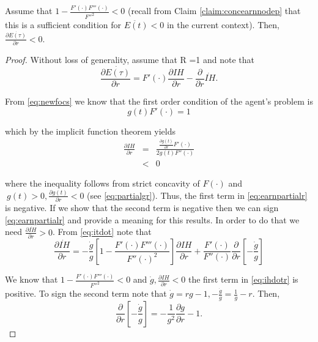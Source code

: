 \begin{claim} \label{claim:moreconcwithighr}
Assume that $1 - \frac{F'(\cdot) F'''(\cdot)}{{F''}^2} < 0$ (recall from Claim \ref{claim:concearnnodep} that this is a sufficient condition for $\ddot{E(t)}<0$ in the current context). Then, $\frac{\partial \dot{E(\tau)}}{\partial r} < 0$.
\end{claim} 

\begin{proof}
Without loss of generality, assume that R =1 and note that\\
\begin{equation}
\frac{\partial \dot{E(\tau)} }{\partial r} = F'(\cdot) \frac{\partial IH}{\partial r} - \frac{\partial}{\partial r} \dot{IH}. \label{eq:earnpartialr}
\end{equation}

\noindent From \eqref{eq:newfocs} we know that the first order condition of the agent's problem is
\begin{equation}
g(t) F'(\cdot) = 1
\end{equation}

\noindent which by the implicit function theorem yields
\begin{eqnarray}
\frac{\partial IH}{\partial r} &=& \frac{\frac{\partial g(t)}{\partial r} F'(\cdot)}{2 g(t) F''(\cdot)} \nonumber \\ 
&<& 0
\end{eqnarray}

\noindent where the inequality follows from strict concavity of $F(\cdot)$ and  $\ g(t) > 0, \frac{\partial g(t)}{ \partial r} <0$ (see \eqref{eq:partialgr}). Thus, the first term in \eqref{eq:earnpartialr} is negative. If we show that the second term is negative then we can sign \eqref{eq:earnpartialr} and provide a meaning for this results. In order to do that we need $\frac{\partial \dot{IH}}{\partial r} > 0$. From \eqref{eq:itdot} note that 
\begin{equation}
\frac{\partial \dot{IH}}{\partial r} = -\frac{\dot{g}}{g} \left[ 1 - \frac{F'(\cdot)F'''(\cdot)}{{F''(\cdot)}^2}\right] \frac{\partial IH}{\partial r} + \frac{F'(\cdot)}{F''(\cdot)}\frac{\partial}{\partial r} \left[ - \frac{\dot{g}}{g} \right] \label{eq:ihdotr}
\end{equation}

\indent We know that $1 - \frac{F'(\cdot) F'''(\cdot)}{{F''}^2} < 0$ and $\dot{g}, \frac{\partial IH}{\partial r} < 0$  the first term in \eqref{eq:ihdotr} is positive. To sign the second term note that $\dot{g} = rg - 1, - \frac{\dot{g}}{g} = \frac{1}{g} - r$. Then,
\begin{equation}
\frac{\partial}{\partial r} \left[ - \frac{\dot{g}}{g} \right] = - \frac{1}{g^2} \frac{\partial g}{\partial r} - 1. \label{eq:dotgg}
\end{equation}


\end{proof}
